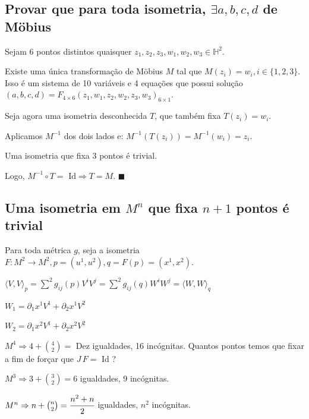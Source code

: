\documentclass[10pt,a4paper]{article}
\begin{document}
		\subsection{Provar que para toda isometria, $\exists a, b, c, d$ de M\"obius}
		\begin{flushright}
		\end{flushright}

		Sejam 6 pontos distintos quaisquer $z_1, z_2, z_3, w_1, w_2, w_3 \in \mathbb{H}^2$.

		Existe uma \'unica transforma\c{c}\~ao de M\"obius $M$ tal que $M(z_i) = w_i, i \in \{ 1, 2, 3 \}$. Isso \'e um sistema de 10 vari\'aveis e 4 equa\c{c}\~oes que possui solu\c{c}\~ao $(a, b, c, d) = F_{4 \times 6} (z_1, w_1, z_2, w_2, z_3, w_3)_{6 \times 1}$.

		Seja agora uma isometria desconhecida $T$, que tamb\'em fixa $T(z_i) = w_i$.

		Aplicamos $M^{-1}$ dos dois lados e: $M^{-1}(T(z_i)) = M^{-1}(w_i) = z_i$.

		Uma isometria que fixa 3 pontos \'e trivial.

		Logo, $M^{-1} \circ T = \text{ Id} \Rightarrow T = M.\,\,\blacksquare$

		\subsection{Uma isometria em $M^n$ que fixa $n + 1$ pontos \'e trivial}
		\begin{flushright}
		\end{flushright}

		Para toda m\'etrica $g$, seja a isometria $F: M^2 \rightarrow M^2, p = (u^1, u^2), q = F(p) = (x^1, x^2)$.

		$\langle V, V\rangle_p = \sum^2 g_{ij}(p) V^i V^j = \sum^2 g_{ij}(q) W^i W^j = \langle W, W\rangle_q$

		$W_1 = \partial_1 x^1 V^1 + \partial_2 x^1 V^2$

		$W_2 = \partial_1 x^2 V^1 + \partial_2 x^2 V^2$

		\vspace{3mm}

		$M^4 \Rightarrow 4 + \binom{4}{2} =$ Dez igualdades, 16 inc\'ognitas. Quantos pontos temos que fixar a fim de for\c{c}ar que $J\,F = $ Id ?

		$M^3 \Rightarrow 3 + \binom{3}{2} = 6$ igualdades, 9 inc\'ognitas.

		$M^n \Rightarrow n + \binom{n}{2} = \cfrac{n^2 + n}{2}$ igualdades, $n^2$ inc\'ognitas.
\end{document}

